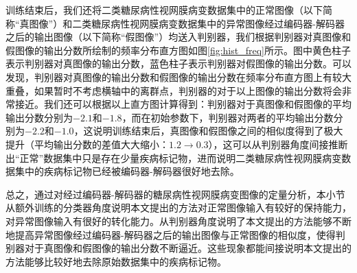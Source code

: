 训练结束后，我们还将二类糖尿病性视网膜病变数据集中的正常图像（以下简称“真图像”）和二类糖尿病性视网膜病变数据集中的异常图像经过编码器-解码器之后的输出图像（以下简称“假图像”）均送入判别器，我们根据判别器对真图像和假图像的输出分数所绘制的频率分布直方图如图\ref{fig:hist_freq}所示。图中黄色柱子表示判别器对真图像的输出分数，蓝色柱子表示判别器对假图像的输出分数。可以发现，判别器对真图像的输出分数和假图像的输出分数在频率分布直方图上有较大重叠，如果暂时不考虑横轴中的离群点，判别器的对于以上图像的输出分数将会非常接近。我们还可以根据以上直方图计算得到：判别器对于真图像和假图像的平均输出分数分别为$-2.1$和$-1.8$，而在初始参数下，判别器对两者的平均输出分数分别为$-2.2$和$-1.0$，这说明训练结束后，真图像和假图像之间的相似度得到了极大提升（平均输出分数的差值大大缩小：$1.2\rightarrow 0.3$），这可以从判别器角度间接推断出“正常”数据集中只是存在少量疾病标记物，进而说明二类糖尿病性视网膜病变数据集中的疾病标记物已经被编码器-解码器很好地去除。

总之，通过对经过编码器-解码器的糖尿病性视网膜病变图像的定量分析，本小节从额外训练的分类器角度说明本文提出的方法对正常图像输入有较好的保持能力，对异常图像输入有很好的转化能力。从判别器角度说明了本文提出的方法能够不断地提高异常图像经过编码器-解码器之后的输出图像与正常图像的相似度，使得判别器对于真图像和假图像的输出分数不断逼近。这些现象都能间接说明本文提出的方法能够比较好地去除原始数据集中的疾病标记物。
